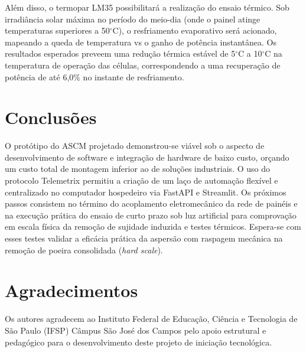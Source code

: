 \documentclass[a4paper,11pt]{article}
\begin{document}
Além disso, o termopar LM35 possibilitará a realização do ensaio térmico. Sob irradiância solar máxima no período do meio-dia (onde o painel atinge temperaturas superiores a 50$^\circ$C), o resfriamento evaporativo será acionado, mapeando a queda de temperatura vs o ganho de potência instantânea. Os resultados esperados preveem uma redução térmica estável de 5$^\circ$C a 10$^\circ$C na temperatura de operação das células, correspondendo a uma recuperação de potência de até 6,0\% no instante de resfriamento.

\section*{Conclusões}

O protótipo do ASCM projetado demonstrou-se viável sob o aspecto de desenvolvimento de software e integração de hardware de baixo custo, orçando um custo total de montagem inferior ao de soluções industriais. O uso do protocolo Telemetrix permitiu a criação de um laço de automação flexível e centralizado no computador hospedeiro via FastAPI e Streamlit. Os próximos passos consistem no término do acoplamento eletromecânico da rede de painéis e na execução prática do ensaio de curto prazo sob luz artificial para comprovação em escala física da remoção de sujidade induzida e testes térmicos. Espera-se com esses testes validar a eficácia prática da aspersão com raspagem mecânica na remoção de poeira consolidada (\textit{hard scale}).

%

\section*{Agradecimentos}

Os autores agradecem ao Instituto Federal de Educação, Ciência e Tecnologia de São Paulo (IFSP) Câmpus São José dos Campos pelo apoio estrutural e pedagógico para o desenvolvimento deste projeto de iniciação tecnológica.


\end{document}
